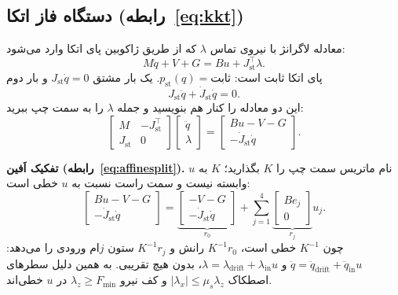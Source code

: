 \documentclass[10pt,twocolumn]{article}
\newcommand{\en}[1]{\lr{#1}}
\begin{document}
\subsection{دستگاه \en{KKT} فاز اتکا (رابطه~\eqref{eq:kkt})}
معادله لاگرانژ با نیروی تماس $\lambda$ که از طریق ژاکوبین پای اتکا وارد می‌شود:
\begin{equation*}
    M\ddot q+V+G=Bu+J_{\mathrm{st}}^{\top}\lambda .
\end{equation*}
پای اتکا ثابت است: $p_{\mathrm{st}}(q)=\text{ثابت}$. یک بار مشتق
$J_{\mathrm{st}}\dot q=0$ و بار دوم
\begin{equation*}
    J_{\mathrm{st}}\ddot q+\dot J_{\mathrm{st}}\dot q=0 .
\end{equation*}
این دو معادله را کنار هم بنویسید و جمله $\lambda$ را به سمت چپ ببرید:
\begin{equation*}
    \begin{bmatrix} M & -J_{\mathrm{st}}^{\top} \\ J_{\mathrm{st}} & 0 \end{bmatrix}
    \begin{bmatrix} \ddot q \\ \lambda \end{bmatrix}
    =\begin{bmatrix} Bu - V - G \\ -\dot J_{\mathrm{st}}\dot q \end{bmatrix}.
\end{equation*}

\textbf{تفکیک اَفین (رابطه~\eqref{eq:affinesplit}).} نام ماتریس سمت چپ را $K$ بگذارید؛ $K$ به
$u$ وابسته نیست و سمت راست نسبت به $u$ خطی است:
\begin{equation*}
    \begin{bmatrix} Bu-V-G \\ -\dot J_{\mathrm{st}}\dot q\end{bmatrix}
    =\underbrace{\begin{bmatrix} -V-G \\ -\dot J_{\mathrm{st}}\dot q\end{bmatrix}}_{r_0}
    +\sum_{j=1}^{4}\underbrace{\begin{bmatrix} B e_j \\ 0\end{bmatrix}}_{r_j}u_j .
\end{equation*}
چون $K^{-1}$ خطی است، $K^{-1}r_0$ رانش و $K^{-1}r_j$ ستون $j$ام ورودی را می‌دهد:
$\ddot q=\ddot q_{\mathrm{drift}}+\ddot q_{\mathrm{in}}u$ و
$\lambda=\lambda_{\mathrm{drift}}+\lambda_{\mathrm{in}}u$، بدون هیچ تقریبی. به همین دلیل
سطرهای اصطکاک $|\lambda_x|\le\mu_s\lambda_z$ و کف نیرو $\lambda_z\ge F_{\min}$ در $u$ خطی‌اند.
\end{document}
